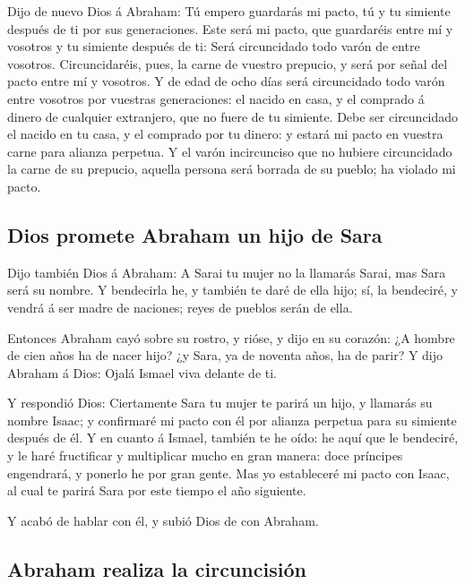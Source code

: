  Dijo de nuevo Dios á Abraham: Tú empero guardarás mi pacto,
tú y tu simiente después de ti por sus generaciones.  Este
será mi pacto, que guardaréis entre mí y vosotros y tu simiente después
de ti: Será circuncidado todo varón de entre vosotros. 
Circuncidaréis, pues, la carne de vuestro prepucio, y será por señal del
pacto entre mí y vosotros.  Y de edad de ocho días será
circuncidado todo varón entre vosotros por vuestras generaciones: el
nacido en casa, y el comprado á dinero de cualquier extranjero, que no
fuere de tu simiente.  Debe ser circuncidado el nacido en
tu casa, y el comprado por tu dinero: y estará mi pacto en vuestra carne
para alianza perpetua.  Y el varón incircunciso que no
hubiere circuncidado la carne de su prepucio, aquella persona será
borrada de su pueblo; ha violado mi pacto.

\hypertarget{dios-promete-abraham-un-hijo-de-sara}{%
\subsection{Dios promete Abraham un hijo de
Sara}\label{dios-promete-abraham-un-hijo-de-sara}}

 Dijo también Dios á Abraham: A Sarai tu mujer no la
llamarás Sarai, mas Sara será su nombre.  Y bendecirla he,
y también te daré de ella hijo; sí, la bendeciré, y vendrá á ser madre
de naciones; reyes de pueblos serán de ella.

 Entonces Abraham cayó sobre su rostro, y rióse, y dijo en
su corazón: ¿A hombre de cien años ha de nacer hijo? ¿y Sara, ya de
noventa años, ha de parir?  Y dijo Abraham á Dios: Ojalá
Ismael viva delante de ti.

 Y respondió Dios: Ciertamente Sara tu mujer te parirá un
hijo, y llamarás su nombre Isaac; y confirmaré mi pacto con él por
alianza perpetua para su simiente después de él.  Y en
cuanto á Ismael, también te he oído: he aquí que le bendeciré, y le haré
fructificar y multiplicar mucho en gran manera: doce príncipes
engendrará, y ponerlo he por gran gente.  Mas yo
estableceré mi pacto con Isaac, al cual te parirá Sara por este tiempo
el año siguiente.

 Y acabó de hablar con él, y subió Dios de con Abraham.

\hypertarget{abraham-realiza-la-circuncisiuxf3n}{%
\subsection{Abraham realiza la
circuncisión}\label{abraham-realiza-la-circuncisiuxf3n}}


